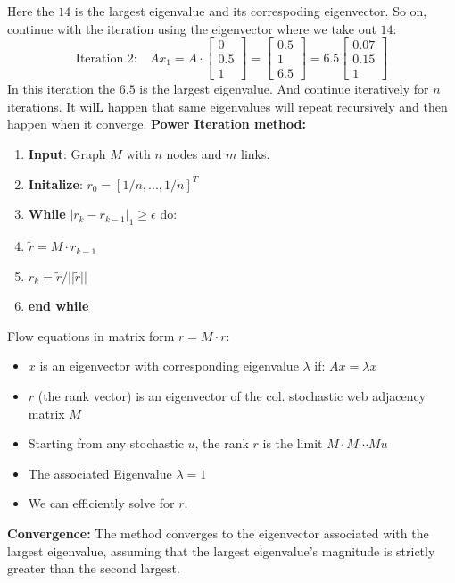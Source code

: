 \documentclass[unicode,11pt,a4paper,oneside,numbers=endperiod,openany]{scrartcl}
\begin{document}
Here the $14$ is the largest eigenvalue and its correspoding eigenvector. So on, continue with the iteration using the eigenvector where we take out $14$:
\[
\text{Iteration 2:}\quad
Ax_1 = A \cdot
\begin{bmatrix}
 0\\0.5\\1
\end{bmatrix} =
\begin{bmatrix}
 0.5\\1\\6.5
\end{bmatrix}=
6.5
\begin{bmatrix}
 0.07 \\ 0.15 \\ 1
\end{bmatrix}
\]
In this iteration the $6.5$ is the largest eigenvalue. And continue iteratively for $n$ iterations. It wilL happen that same eigenvalues will repeat recursively and then happen when it converge.
\newline
\textbf{Power Iteration method:}
\begin{enumerate}
\item {\textbf{Input}: Graph $M$ with $n$ nodes and $m$ links.}
\item{\textbf{Initalize}: $r_0=[1/n,...,1/n]^T$}
\item{\textbf{While} $|r_k-r_{k-1}|_1 \geq \epsilon $ do:}
\item{\quad $\tilde{r}=M\cdot r_{k-1}$}
\item{\quad $r_k=\tilde{r}/||\tilde{r}||$}
\item{\textbf{end while}}
\end{enumerate}

Flow equations in matrix form $r=M\cdot r$:
\begin{itemize}
 \item{$x$ is an eigenvector with corresponding eigenvalue $\lambda$ if: $Ax=\lambda x$}
 \item{$r$ (the rank vector) is an eigenvector of the col. stochastic web adjacency matrix $M$}
 \item {Starting from any stochastic $u$, the rank $r$ is the limit $M \cdot M \cdots Mu$}
 \item{The associated Eigenvalue $\lambda=1$}
 \item{We can efficiently solve for $r$.}
\end{itemize}


\textbf{Convergence:} The method converges to the eigenvector associated with the largest eigenvalue, assuming that the largest eigenvalue's magnitude is strictly greater than the second largest.
\end{document}
